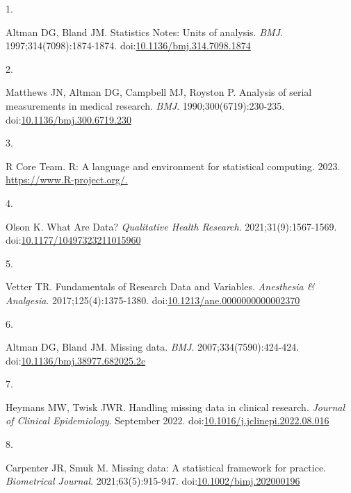 \documentclass[
]{book}
\newlength{\cslhangindent}
\newlength{\csllabelwidth}
\newlength{\cslentryspacingunit} %
\newenvironment{CSLReferences}[2] %
 {%
  \setlength{\parindent}{0pt}
  \ifodd #1
  \let\oldpar\par
  \def\par{\hangindent=\cslhangindent\oldpar}
  \fi
  \setlength{\parskip}{#2\cslentryspacingunit}
 }%
 {}
\newcommand{\CSLLeftMargin}[1]{\parbox[t]{\csllabelwidth}{#1}}
\newcommand{\CSLRightInline}[1]{\parbox[t]{\linewidth - \csllabelwidth}{#1}\break}
\begin{document}
\hypertarget{refs}{}
\begin{CSLReferences}{0}{0}
\leavevmode{}%
\CSLLeftMargin{1. }%
\CSLRightInline{Altman DG, Bland JM. Statistics Notes: Units of analysis. \emph{BMJ}. 1997;314(7098):1874-1874. doi:\href{https://doi.org/10.1136/bmj.314.7098.1874}{10.1136/bmj.314.7098.1874}}

\leavevmode{}%
\CSLLeftMargin{2. }%
\CSLRightInline{Matthews JN, Altman DG, Campbell MJ, Royston P. Analysis of serial measurements in medical research. \emph{BMJ}. 1990;300(6719):230-235. doi:\href{https://doi.org/10.1136/bmj.300.6719.230}{10.1136/bmj.300.6719.230}}

\leavevmode{}%
\CSLLeftMargin{3. }%
\CSLRightInline{R Core Team. R: A language and environment for statistical computing. 2023. \href{https://www.R-project.org/}{https://www.R-project.org/.}}

\leavevmode{}%
\CSLLeftMargin{4. }%
\CSLRightInline{Olson K. What Are Data? \emph{Qualitative Health Research}. 2021;31(9):1567-1569. doi:\href{https://doi.org/10.1177/10497323211015960}{10.1177/10497323211015960}}

\leavevmode{}%
\CSLLeftMargin{5. }%
\CSLRightInline{Vetter TR. Fundamentals of Research Data and Variables. \emph{Anesthesia \& Analgesia}. 2017;125(4):1375-1380. doi:\href{https://doi.org/10.1213/ane.0000000000002370}{10.1213/ane.0000000000002370}}

\leavevmode{}%
\CSLLeftMargin{6. }%
\CSLRightInline{Altman DG, Bland JM. Missing data. \emph{BMJ}. 2007;334(7590):424-424. doi:\href{https://doi.org/10.1136/bmj.38977.682025.2c}{10.1136/bmj.38977.682025.2c}}

\leavevmode{}%
\CSLLeftMargin{7. }%
\CSLRightInline{Heymans MW, Twisk JWR. Handling missing data in clinical research. \emph{Journal of Clinical Epidemiology}. September 2022. doi:\href{https://doi.org/10.1016/j.jclinepi.2022.08.016}{10.1016/j.jclinepi.2022.08.016}}

\leavevmode{}%
\CSLLeftMargin{8. }%
\CSLRightInline{Carpenter JR, Smuk M. Missing data: A statistical framework for practice. \emph{Biometrical Journal}. 2021;63(5):915-947. doi:\href{https://doi.org/10.1002/bimj.202000196}{10.1002/bimj.202000196}}


\end{CSLReferences}
\end{document}
